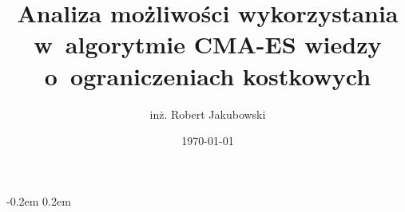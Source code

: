 \documentclass{mini}
\title{Analiza możliwości wykorzystania w~algorytmie CMA-ES wiedzy o~ograniczeniach kostkowych}
\author{inż. Robert Jakubowski}
\date{\today}
\begin{document}
\maketitle

\pagebreak
\thispagestyle{empty}

\openup -0.2em %
\tableofcontents 
\openup 0.2em %

\thispagestyle{empty}
\raggedbottom
\pagebreak





\makestatement
\end{document}
